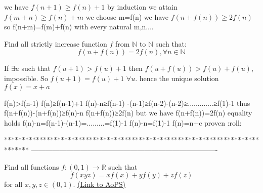 \begin{solution}
	we have $ f(n+1) \ge f(n)+1$ by induction we attain $ f(m+n) \ge f(n)+m$
we choose m=f(n) we have $ f(n+f(n)) \ge 2f(n)$ so f(n+m)=f(m)+f(n) with every natural m,n....
\end{solution}



\begin{solution}
	\begin{tcolorbox}Find all strictly increase function $ f$ from $ \mathbb {N}$ to $ \mathbb {N}$ such that:
\[ f(n + f(n)) = 2f(n), \forall n\in \mathbb {N}\]
\end{tcolorbox}

If $ \exists u$ such that $ f(u+1)>f(u)+1$ then $ f(u+f(u))>f(u)+f(u)$, impossible. So $ f(u+1)=f(u)+1$ $ \forall u$. hence the unique solution $ f(x)=x+a$
\end{solution}



\begin{solution}
	f(n)>f(n-1)
 f(n)≥f(n-1)+1
 f(n)-n≥f(n-1) -(n-1)≥f(n-2)-(n-2)≥.............≥f(1)-1
 thus f(n+f(n))-(n+f(n))≥f(n)-n 
 f(n+f(n))≥2f(n)
 but we have f(n+f(n))=2f(n)
 equality holds f(n)-n=f(n-1)-(n-1)=.........=f(1)-1
 f(n)-n=f(1)-1  f(n)=n+c proven :roll:
\end{solution}
*******************************************************************************
-------------------------------------------------------------------------------

\begin{problem}
	Find all functions $f: (0,1) \to \mathbb R$ such that
\[f(xyz) = xf(x) + yf(y) + zf(z)\]
for all $x,y,z \in (0,1)$.
	\flushright \href{https://artofproblemsolving.com/community/c6h317539}{(Link to AoPS)}
\end{problem}



